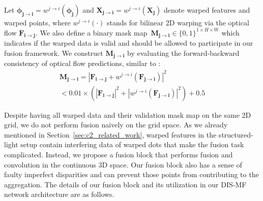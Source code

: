 Let $\boldsymbol{\phi_{j \rightarrow i}}=w^{j \rightarrow i}(\boldsymbol{\phi_j})$ and $\boldsymbol{X_{j \rightarrow i}}=w^{j \rightarrow i}(\boldsymbol{X_j})$ denote warped features and warped points, where $w^{j \rightarrow i}(\cdot)$ stands for bilinear 2D warping via the optical flow $\boldsymbol{F_{i \rightarrow j}}$. We also define a binary mask map~$\boldsymbol{M_{j \rightarrow i}} \in \{0,1\}^{1 \times H \times W}$ which indicates if the warped data is valid and should be allowed to participate in our fusion framework. We construct $\boldsymbol{M_{j \rightarrow i}}$ by evaluating the forward-backward consistency of optical flow predictions, similar to \cite{zou2018df,meister2017unflow}:
\begin{multline}\label{eqn:flow_forward_backward}
    \boldsymbol{M_{j \rightarrow i}} = |\boldsymbol{F_{i \rightarrow j}} + w^{j \rightarrow i}(\boldsymbol{F_{j \rightarrow i}})|^2\\
    < 0.01 \times (|\boldsymbol{F_{i \rightarrow j}}|^2 + |w^{j \rightarrow i}(\boldsymbol{F_{j \rightarrow i}})|^2) + 0.5
\end{multline}

Despite having all warped data and their validation mask map on the same 2D grid, we do not perform fusion naively on the grid space. As we already mentioned in Section~\ref{sec:c2_related_work}, warped features in the structured-light setup contain interfering data of warped dots that make the fusion task complicated. Instead, we propose a fusion block that performs fusion and convolution in the continuous 3D space. Our fusion block also has a sense of faulty imperfect disparities and can prevent those points from contributing to the aggregation. The details of our fusion block and its utilization in our DIS-MF network architecture are as follows.

